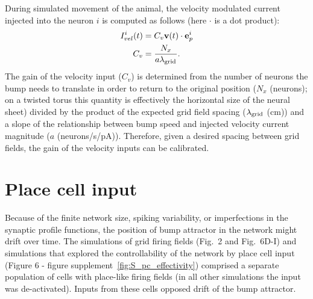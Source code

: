 \documentclass[a4paper,12pt]{article}
\newcommand{\ssc}[3]{\ensuremath{#1_{\text{#2}_{\text{#3}}}}}
\newcommand{\lamgrid}{\ssc{\lambda}{\scriptsize{grid}}{}}
\begin{document}
During simulated movement of the animal, the velocity modulated current
injected into the neuron $i$ is computed as follows (here $\cdot$ is a dot
product):
\begin{eqnarray}
    I_{vel}^i(t) &= C_v \mathbf{v}(t) \cdot \mathbf{e}_p^i \notag \\
    C_v          &= \frac{N_x}{a\lamgrid}.
\end{eqnarray}
The gain of the velocity input ($C_v$) is determined from the number of neurons
the bump needs to translate in order to return to the original position
($N_x$ (neurons); on a twisted torus this quantity is effectively the horizontal size of
the neural sheet) divided by the product of the expected grid field spacing
($\lamgrid$ (cm)) and a slope of the relationship between bump speed and injected
velocity current magnitude ($a$ (neurons/s/pA)). Therefore, given a desired
spacing between grid fields, the gain of the velocity inputs can be calibrated.


\section{Place cell input} \label{sec:place_cells}

Because of the finite network size, spiking variability, or imperfections in
the synaptic profile functions, the position of bump attractor in the network
might drift over time. The simulations of grid firing fields (Fig.~2 and
Fig.~6D-I) and simulations that explored the controllability of the network by
place cell input (Figure 6 - figure supplement~\ref{fig:S_pc_effectivity})
comprised a separate population of cells with place-like firing fields (in all
other simulations the input was de-activated). Inputs from these cells opposed
drift of the bump attractor.
\end{document}
